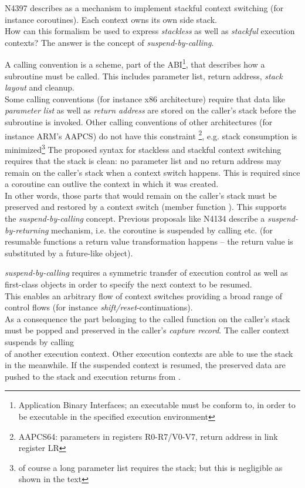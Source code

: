 \newpage
{}
N4397\cite{N4397} describes \ectx as a mechanism to implement stackful context
switching (for instance coroutines). Each context owns its own side stack.\\
How can this formalism be used to express \emph{stackless} as well as
\emph{stackful} execution contexts? The answer is the concept of
\emph{suspend-by-calling}.

A calling convention is a scheme, part of the ABI\footnote{Application Binary
Interfaces; an executable must be conform to, in order to be executable in the
specified execution environment}, that describes how a subroutine must be
called. This includes parameter list, return address, \emph{stack layout} and
cleanup.\\
Some calling conventions (for instance x86 architecture) require that data like
\emph{parameter list} as well as \emph{return address} are stored on the caller's
stack before the subroutine is invoked. Other calling conventions of other
architectures (for instance ARM's AAPCS) do not have this constraint
\footnote{AAPCS64: parameters in registers R0-R7/V0-V7, return address in link
register LR}, e.g. stack consumption is minimized\footnote{of course a long
parameter list requires the stack; but this is negligible as shown in the text}
\newline
The proposed syntax for stackless and stackful context switching requires that
the stack is clean: no parameter list and no return address may remain on the
caller's stack when a context switch happens. This is required since a
coroutine can outlive the context in which it was created.\\
In other words, those parts that would remain on the caller's stack must be
preserved and restored by a context switch (member function \ectxop). This
supports the \emph{suspend-by-calling} concept. Previous proposals like
N4134\cite{N4134} describe a \emph{suspend-by-returning} mechanism, i.e. the
coroutine is suspended by calling \yield etc. (for resumable functions a return
value transformation happens -- the return value is substituted by a future-like
object).

\emph{suspend-by-calling} requires a symmetric transfer of execution control
as well as first-class objects in order to specify the next context to be
resumed.\\
This enables an arbitrary flow of context switches providing a broad range of
control flows (for instance \emph{shift/reset}-continuations).\\
As a consequence the part belonging to the called function on the caller's stack
must be popped and preserved in the caller's \emph{capture record}. The caller
context suspends by calling\\
\ectxop of another execution context. Other execution contexts are able to use
the stack in the meanwhile. If the suspended context is resumed, the preserved
data are pushed to the stack and execution returns from \ectxop.

